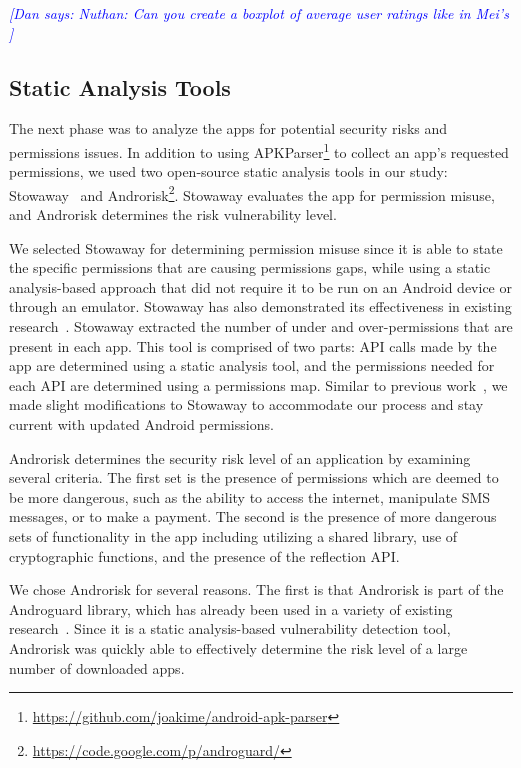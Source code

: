 \documentclass{sig-alternate-05-2015}
\newcommand{\todo}[1]{\textcolor{cyan}{\textbf{[#1]}}}
\newcommand{\dan}[1]{\textcolor{blue}{{\it [Dan says: #1]}}}
\begin{document}
\dan{Nuthan: Can you create a boxplot of average user ratings like in Mei's \cite{tian2015characteristics}}





\subsection{Static Analysis Tools}
\label{sec: analysis}

The next phase was to analyze the apps for potential security risks and permissions issues. In addition to using APKParser\footnote{\url{https://github.com/joakime/android-apk-parser}} to collect an app's requested permissions, we used two open-source static analysis tools in our study: Stowaway~\cite{Felt:2011:APD:2046707.2046779} and Androrisk\footnote{\url{https://code.google.com/p/androguard/}}. Stowaway evaluates the app for permission misuse, and Androrisk determines the risk vulnerability level.


We selected Stowaway for determining permission misuse since it is able to state the specific permissions that are causing permissions gaps, while using a static analysis-based approach that did not require it to be run on an Android device or through an emulator. Stowaway has also demonstrated its effectiveness in existing research~\cite{Stevens:2013:APU:2487085.2487093, Felt:2011:APD:2046707.2046779, Pearce:2012:APS:2414456.2414498}. Stowaway extracted the number of under and over-permissions that are present in each app. This tool is comprised of two parts: API calls made by the app are determined using a static analysis tool, and the permissions needed for each API are determined using a permissions map. Similar to previous work~\cite{Stevens:2013:APU:2487085.2487093}, we made slight modifications to Stowaway to accommodate our process and stay current with updated Android permissions.


Androrisk determines the security risk level of an application by examining several criteria. The first set is the presence of permissions which are deemed to be more dangerous, such as the ability to access the internet, manipulate SMS messages, or to make a payment. The second is the presence of more dangerous sets of functionality in the app including utilizing a shared library, use of cryptographic functions, and the presence of the reflection API.

We chose Androrisk for several reasons. The first is that Androrisk is part of the Androguard library, which has already been used in a variety of existing research~\cite{Egele:2013:ESC:2508859.2516693, Vidas:2014:AAA:2666620.2666630, Atzeni:2014:DYA:2692983.2693001}. Since it is a static analysis-based vulnerability detection tool, Androrisk was quickly able to effectively determine the risk level of a large number of downloaded apps.
\end{document}
